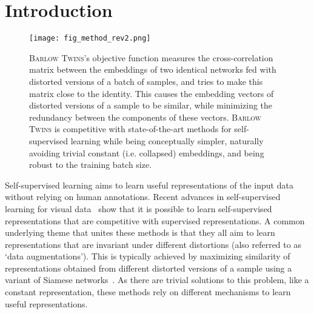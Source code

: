 \documentclass{article}
\newcommand{\AlgoName}{\textsc{Barlow Twins}}
\begin{document}
\section{Introduction}


\begin{figure}[ht]
\vskip 0.2in
\begin{center}
\centerline{\texttt{[image: fig\_method\_rev2.png]}}
\caption{\AlgoName{}'s objective function measures the cross-correlation matrix between the embeddings of two identical networks fed with distorted versions of a batch of samples, and tries to make this matrix close to the identity. This causes the embedding vectors of distorted versions of a sample to be similar, while minimizing the redundancy between the components of these vectors. \AlgoName{} is competitive with state-of-the-art methods for self-supervised learning while being conceptually simpler, naturally avoiding trivial constant (i.e. collapsed) embeddings, and being robust to the training batch size.}
\label{fig:fig_method}
\end{center}
\vskip -0.2in
\end{figure}

Self-supervised learning aims to learn useful representations of the input data without relying on human annotations. 
Recent advances in self-supervised learning for visual data~\cite{caron2020swav,grill2020bootstrap,chen2020simple,he2019momentum,misra2019self} show that it is possible to learn self-supervised representations that are competitive with supervised representations. 
A common underlying theme that unites these methods is that they all aim to learn representations that are invariant under different distortions (also referred to as `data augmentations'). 
This is typically achieved by maximizing similarity of representations obtained from different distorted versions of a sample using a variant of Siamese networks~\cite{hadsell2006dimensionality}.
As there are trivial solutions to this problem, like a constant representation, these methods rely on different mechanisms to learn useful representations.
\end{document}
